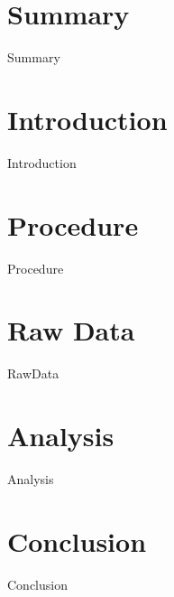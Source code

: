 \documentclass[12pt,a4paper]{article}
\begin{document}
    \tableofcontents
    \section{Summary}
        {Summary}
    \section{Introduction}
        {Introduction}
    \section{Procedure}
        {Procedure}
    \section{Raw Data}
	    {RawData}
    \section{Analysis}
		{Analysis}
    \section{Conclusion}
	    {Conclusion}
\end{document}
